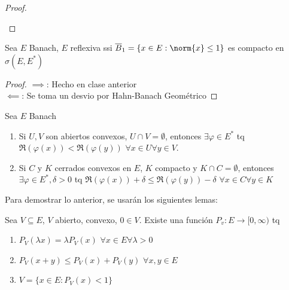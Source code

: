 \documentclass{notetaking}
\begin{document}
\begin{proof}
\begin{enumerate}
    \end{enumerate}
\end{proof}

\begin{thm}
    Sea \(E\) Banach, \(E\) reflexiva ssi \(\overline{B}_1=\{x\in E:\norm{x}\leq1\}\) es compacto en \(\sigma(E,E^*)\)
\end{thm}
\begin{proof}
    \(\implies\): Hecho en clase anterior%
    \\
    \(\impliedby\): Se toma un desvio por Hahn-Banach Geométrico
\end{proof}

\begin{thm}
    Sea \(E\) Banach
    \begin{enumerate}
        \item Si \(U,V\) son abiertos convexos, \(U\cap V=\emptyset\), entonces \(\exists \varphi\in E^*\) tq \(\Re(\varphi(x))<\Re(\varphi(y))\) \(\forall x\in U\forall y\in V\).
        \item Si \(C\) y \(K\) cerrados convexos en \(E\), \(K\) compacto y \(K\cap C=\emptyset\), entonces \(\exists \varphi\in E^*,\delta>0\) tq \(\Re(\varphi(x))+\delta\leq\Re(\varphi(y))-\delta\) \(\forall x\in C\forall y\in K\)
    \end{enumerate}
\end{thm}
Para demostrar lo anterior, se usarán los siguientes lemas:
\begin{lem}
    Sea \(V\subseteq E\), \(V\) abierto, convexo, \(0\in V\). Existe una función \(P_v:E\rightarrow[0,\infty)\) tq
    \begin{enumerate}
        \item \(P_V(\lambda x)=\lambda P_V(x)\) \(\forall x\in E\forall\lambda>0\)
        \item \(P_V(x+y)\leq P_V(x)+P_V(y)\) \(\forall x,y\in E\)
        \item \(V=\{x\in E:P_V(x)<1\}\)
    \end{enumerate}
\end{lem}
\end{document}
